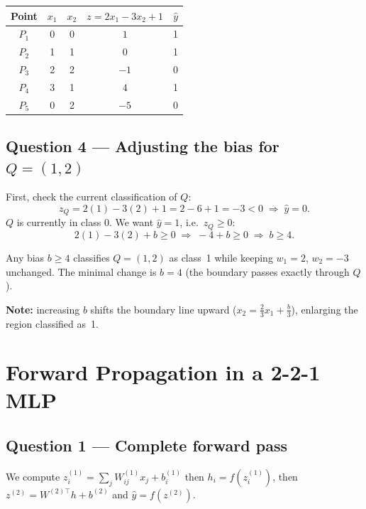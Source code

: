 \documentclass[11pt, a4paper]{article}
\begin{document}
\begin{center}
\renewcommand{\arraystretch}{1.5}
\begin{tabular}{ccccc}
\toprule
Point & $x_1$ & $x_2$ & $z = 2x_1 - 3x_2 + 1$ & $\hat{y}$ \\
\midrule
$P_1$ & 0 & 0 & $1$  & 1 \\
$P_2$ & 1 & 1 & $0$  & 1 \\
$P_3$ & 2 & 2 & $-1$ & 0 \\
$P_4$ & 3 & 1 & $4$  & 1 \\
$P_5$ & 0 & 2 & $-5$ & 0 \\
\bottomrule
\end{tabular}
\end{center}

\subsection*{Question 4 — Adjusting the bias for $Q=(1,2)$}

First, check the current classification of $Q$:
\[
  z_Q = 2(1) - 3(2) + 1 = 2 - 6 + 1 = -3 < 0 \;\Rightarrow\; \hat{y} = 0.
\]
$Q$ is currently in class 0. We want $\hat{y}=1$, i.e.\ $z_Q \geq 0$:
\[
  2(1) - 3(2) + b \geq 0 \;\Rightarrow\; -4 + b \geq 0 \;\Rightarrow\; b \geq 4.
\]

\begin{tcolorbox}[answerbox, title={Answer}]
Any bias $b \geq 4$ classifies $Q=(1,2)$ as class~1 while keeping $w_1=2$, $w_2=-3$ unchanged.
The minimal change is $b = 4$ (the boundary passes exactly through $Q$).

\textbf{Note:} increasing $b$ shifts the boundary line upward ($x_2 = \tfrac{2}{3}x_1 + \tfrac{b}{3}$),
enlarging the region classified as~1.
\end{tcolorbox}

\section{Forward Propagation in a 2-2-1 MLP}

\subsection*{Question 1 — Complete forward pass}

We compute $z_i^{(1)} = \sum_j W^{(1)}_{ij} x_j + b^{(1)}_i$ then $h_i = f(z_i^{(1)})$, then
$z^{(2)} = W^{(2)\top} h + b^{(2)}$ and $\hat{y} = f(z^{(2)})$.
\end{document}
